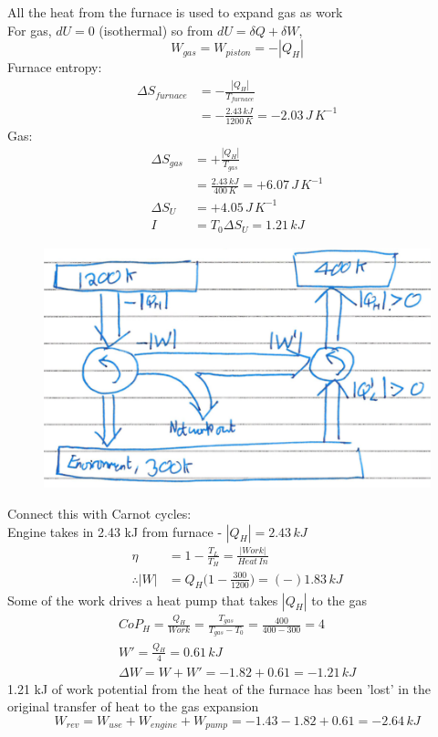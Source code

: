 \documentclass[a4paper, 11pt, normalem]{report}
\begin{document}
All the heat from the furnace is used to expand gas as work \\
For gas, $dU = 0$ (isothermal) so from $dU = \delta Q + \delta W$,
\begin{equation*}
    W_{gas} = W_{piston} = -|Q_H|
\end{equation*}
Furnace entropy:
\begin{align*}
    \Delta S_{furnace} &= -\frac{|Q_H|}{T_{furnace}} \\
    &= -\frac{2.43\,kJ}{1200\,K} = -2.03\,J\,K^{-1}
\end{align*}
Gas:
\begin{align*}
    \Delta S_{gas} &= +\frac{|Q_H|}{T_{gas}} \\
    &= \frac{2.43\,kJ}{400\,K} = +6.07\,J\,K^{-1} \\
    \Delta S_U &= +4.05\,J\,K^{-1} \\
    I &= T_0 \Delta S_U = 1.21\,kJ
\end{align*}

\begin{figure}
    \begin{center}
        \includegraphics[scale=0.4]{Carnot10.png}
        \vspace{-50pt}
    \end{center}
\end{figure}
Connect this with Carnot cycles: \\
Engine takes in 2.43 kJ from furnace - $|Q_H| = 2.43\,kJ$
\begin{align*}
    \eta &= 1 - \frac{T_L}{T_H} = \frac{|Work|}{Heat\,In} \\
    \therefore |W| &= Q_H \Big(1 - \frac{300}{1200}\Big) = (-)1.83\,kJ
\end{align*}
Some of the work drives a heat pump that takes $|Q_H|$ to the gas
\begin{gather*}
    CoP_H = \frac{Q_H}{Work} = \frac{T_{gas}}{T_{gas} - T_0} = \frac{400}{400 - 300} = 4 \\
    W' = \frac{Q_H}{4} = 0.61\,kJ \\
    \Delta W = W + W' = -1.82 + 0.61 = -1.21\,kJ
\end{gather*}
1.21 kJ of work potential from the heat of the furnace has been 'lost' in the original transfer of heat to the gas expansion
\begin{equation*}
    W_{rev} = W_{use} + W_{engine} + W_{pump} = -1.43 - 1.82 + 0.61 = -2.64\,kJ
\end{equation*}
\end{document}
